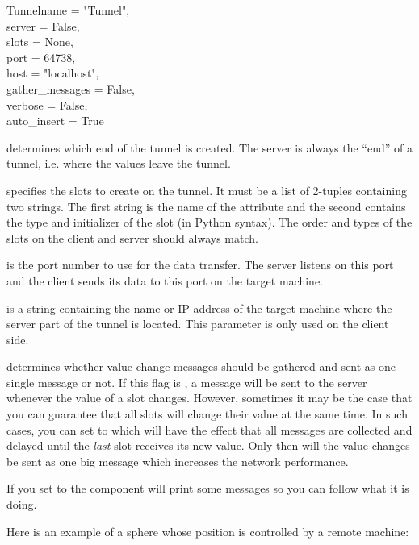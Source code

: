 \begin{classdesc}{Tunnel}{name = "Tunnel",\\ 
			  server = False, \\
                          slots = None, \\
                          port = 64738, \\
                          host = "localhost", \\
			  gather_messages = False, \\
                          verbose = False, \\
                          auto_insert = True}

 determines which end of the tunnel is created. The server is
always the ``end'' of a tunnel, i.e. where the values leave the
tunnel.  

 specifies the slots to create on the tunnel. It
must be a list of 2-tuples containing two strings. The first string is
the name of the attribute and the second contains the type and
initializer of the slot (in Python syntax). The order and types of the
slots on the client and server should always match.  

 is the port number to use for the data transfer. The server
listens on this port and the client sends its data to this port on the
target machine.

 is a string containing the name or IP address of the target
machine where the server part of the tunnel is located. This parameter
is only used on the client side.

 determines whether value change messages should be
gathered and sent as one single message or not. If this flag is ,
a message will be sent to the server whenever the value of a slot changes.
However, sometimes it may be the case that you can guarantee that all slots
will change their value at the same time. In such cases, you can set 
 to  which will have the effect that all
messages are collected and delayed until the {\em last} slot receives its 
new value. Only then will the value changes be sent as one big message
which increases the network performance.

If you set  to  the component will print some
messages so you can follow what it is doing.

\end{classdesc}


Here is an example of a sphere whose position is controlled by a remote
machine:


